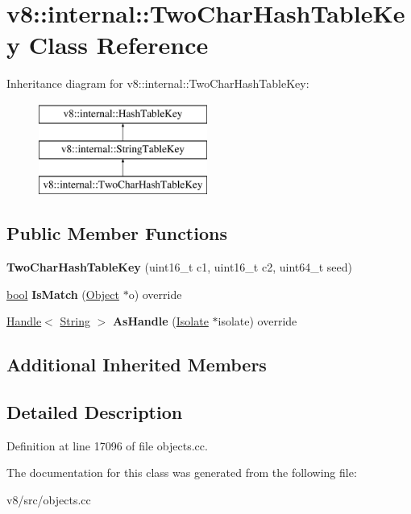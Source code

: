 \hypertarget{classv8_1_1internal_1_1TwoCharHashTableKey}{}\section{v8\+:\+:internal\+:\+:Two\+Char\+Hash\+Table\+Key Class Reference}
\label{classv8_1_1internal_1_1TwoCharHashTableKey}
Inheritance diagram for v8\+:\+:internal\+:\+:Two\+Char\+Hash\+Table\+Key\+:\begin{figure}[H]
\begin{center}
\leavevmode
\includegraphics[height=3.000000cm]{classv8_1_1internal_1_1TwoCharHashTableKey}
\end{center}
\end{figure}
\subsection*{Public Member Functions}
\begin{DoxyCompactItemize}
\item 
\mbox{\label{classv8_1_1internal_1_1TwoCharHashTableKey_afb6ea3cef093853167dc34a0c4a3fa2e}} 
{\bfseries Two\+Char\+Hash\+Table\+Key} (uint16\+\_\+t c1, uint16\+\_\+t c2, uint64\+\_\+t seed)
\item 
\mbox{\label{classv8_1_1internal_1_1TwoCharHashTableKey_a2e24bde0b27cf0ebe7c3bb1c41d8cb51}} 
\mbox{\hyperlink{classbool}{bool}} {\bfseries Is\+Match} (\mbox{\hyperlink{classv8_1_1internal_1_1Object}{Object}} $\ast$o) override
\item 
\mbox{\label{classv8_1_1internal_1_1TwoCharHashTableKey_a651db461426447cf9be2254f0a396eed}} 
\mbox{\hyperlink{classv8_1_1internal_1_1Handle}{Handle}}$<$ \mbox{\hyperlink{classv8_1_1internal_1_1String}{String}} $>$ {\bfseries As\+Handle} (\mbox{\hyperlink{classv8_1_1internal_1_1Isolate}{Isolate}} $\ast$isolate) override
\end{DoxyCompactItemize}
\subsection*{Additional Inherited Members}


\subsection{Detailed Description}


Definition at line 17096 of file objects.\+cc.



The documentation for this class was generated from the following file\+:\begin{DoxyCompactItemize}
\item 
v8/src/objects.\+cc\end{DoxyCompactItemize}
